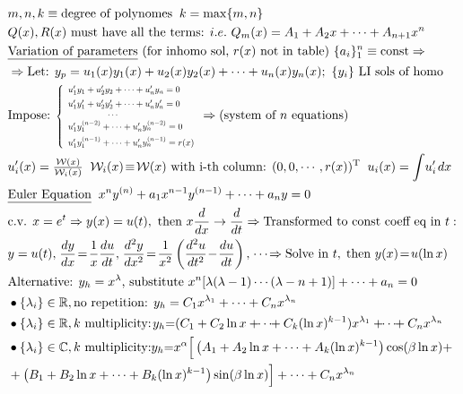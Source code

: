     \vspace{-5pt}
\begin{align*}
    &m, n, k \equiv \text{degree of polynomes} \; \;  k = \max\{m,n\}\\
   &Q(x), R(x) \text{ must have all the terms: } i.e. \ Q_m(x)= A_1 +A_2x+ \cdots+ A_{n+1}x^n\\
   &\underline{\text{Variation of parameters}} \ \text{(for inhomo sol, $r(x)$ not in table)} \ \{a_i\}_1^n\equiv \text{const} \Rightarrow \\
    &\Rightarrow \text{Let: } y_p = u_1(x)y_1(x) + u_2(x)y_2(x) + \cdots + u_n(x)y_n(x); \ \{y_i\} \text{ LI sols of homo}\\
    &\text{Impose: } 
  \scalebox{0.7}{$
\left\{
\begin{array}{l}
u_1'y_1 + u_2'y_2 + \cdots + u_n'y_n = 0 \\[1ex]
u_1'y_1' + u_2'y_2' + \cdots + u_n'y_n' = 0 \\
\hspace{45pt}\cdots \\
u_1'y_1^{(n-2)} + \cdots + u_n'y_n^{(n-2)} = 0 \\[1ex]
u_1'y_1^{(n-1)} + \cdots + u_n'y_n^{(n-1)} = r(x)
\end{array}
\right.
$}
 \Rightarrow \text{(system of $n$ equations)}\\
    &u_i'(x) = \tfrac{\mathcal{W}(x)}{\mathcal{W}_i (x)} \;\;  \mathcal{W}_i (x) \!\equiv \! \mathcal{W}(x) \text{ with i-th column: } (0,0, \cdots, r(x))^{\text{T}} \; \; u_i(x)= \int \!u_i' \;\! dx\\
     &\underline{\text{Euler Equation}} \;\; x^n y^{(n)} + a_1 x^{n-1} y^{(n-1)} + \cdots + a_n y = 0\\
    &\text{c.v. } x = e^t \Rightarrow y(x) = u(t), \text{ then } x \frac{d}{dx} \to \frac{d}{dt} \Rightarrow \text{Transformed to const coeff eq in } t:\\
    &y = u(t), \;\! \frac{dy}{dx} \!=\! \frac{1}{x}\frac{du}{dt}, \;\! \frac{d^2y}{dx^2} \!=\! \frac{1}{x^2}\left(\frac{d^2u}{dt^2} \!-\! \frac{du}{dt} \right), \;\!\cdots \!\Rightarrow \text{Solve in } t,\; \text{then } y(x) \!=\! u(\ln x)\\ 
    &\text{Alternative: } y_h = x^\lambda\text{, substitute } x^n[\lambda(\lambda-1)\cdots(\lambda-n+1)] + \cdots + a_n = 0\\
&\bullet \{\lambda_i\} \in \mathbb{R}, \text{no repetition: }y_h = C_1x^{\lambda_1} + \cdots + C_nx^{\lambda_n}\\
&\bullet  \{\lambda_i\} \in \mathbb{R}, k\text{ multiplicity:}\;\! y_h {=} (C_1 + C_2\ln x + \!\!\cdots\!\! + C_k(\ln x)^{k-1})x^{\lambda_1} +\!\!\cdots\!\! + C_nx^{\lambda_n}\\
&\bullet  \{\lambda_i\} \in \mathbb{C}, k\text{ multiplicity:} y_h {=} 
x^{\alpha} \Big[\left(A_1 + A_2 \ln x + \cdots + A_{k}(\ln x)^{k-1}\right)\cos(\beta \ln x) +\\
& + \left(B_1 + B_2 \ln x + \cdots + B_{k}(\ln x)^{k-1}\right)\sin(\beta \ln x)\Big] + \cdots + C_nx^{\lambda_n}
\end{align*}
